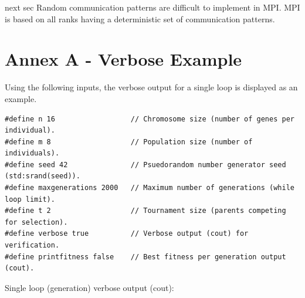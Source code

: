 \documentclass{article}
\begin{document}
next sec
Random communication patterns are difficult to implement in MPI. MPI is based on all ranks having a deterministic set of communication patterns.


\newpage



 


\newpage
\section*{Annex A - Verbose Example}
Using the following inputs, the verbose output for a single loop is displayed as an example.
\begin{lstlisting}
#define n 16                  // Chromosome size (number of genes per individual).
#define m 8                   // Population size (number of individuals).
#define seed 42               // Psuedorandom number generator seed (std:srand(seed)).
#define maxgenerations 2000   // Maximum number of generations (while loop limit).
#define t 2                   // Tournament size (parents competing for selection).
#define verbose true          // Verbose output (cout) for verification.
#define printfitness false    // Best fitness per generation output (cout).
\end{lstlisting}
Single loop (generation) verbose output (cout):
\end{document}
